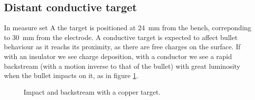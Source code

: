 \subsection{Distant conductive target}
In measure set A the target is positioned at \SI{24}{\milli\meter} from the bench, correponding to \SI{30}{\milli\meter} from the electrode. A conductive target is expected to affect bullet behaviour as it reachs its proximity, as there are free charges on the surface. If with an insulator we see charge deposition, with a conductor we see a rapid backstream (with a motion inverse to that of the bullet) with great luminosity when the bullet impacts on it, as in figure \ref{fig:elio_met}.
\begin{figure}
 \centering
 \hfill
 \hfill
 \caption{Impact and backstream with a copper target.}
 \label{fig:elio_met}
\end{figure}

